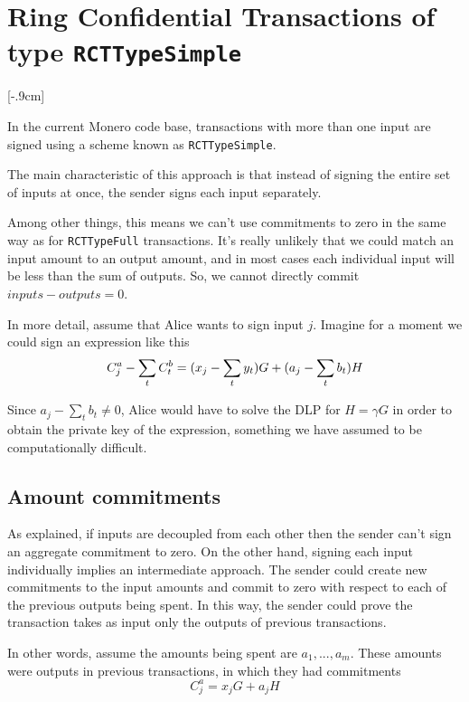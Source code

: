 \section{Ring Confidential Transactions of type {\tt RCTTypeSimple}}[-.9cm]
\label{sec:RCTTypeSimple}

In the current Monero code base, transactions with more than one input are signed using a scheme known as {\tt RCTTypeSimple}.

The main characteristic of this approach is that instead of signing the entire set of inputs at once, the sender signs each input separately.

Among other things, this means we can’t use commitments to zero in the same way as for {\tt RCTTypeFull} transactions. It's really unlikely that we could match an input amount to an output amount, and in most cases each individual input will be less than the sum of outputs. So, we cannot directly commit $inputs - outputs = 0$.

In more detail, assume that Alice wants to sign input $j$. Imagine for a moment we could sign an expression like this\vspace{.2cm}
\[  C^a_{j} - \sum\limits_t C^b_{t} \\
= (x_j -  \sum_t y_t) G + (a_j - \sum\limits_t  b_t) H \]

Since \(a_j - \sum\limits_t  b_t \ne 0\), Alice would have to solve the DLP for \(H = \gamma G\) in order to obtain the private key of the expression, something we have assumed to be computationally difficult.


\subsection{Amount commitments}
\label{RCTTypeSimple-commitments}

As explained, if inputs are decoupled from each other then the sender can't sign an aggregate commitment to zero. On the other hand, signing each input individually implies an intermediate approach. The sender could create new commitments to the input amounts and commit to zero with respect to each of the previous outputs being spent. In this way, the sender could prove the transaction takes as input only the outputs of previous transactions.

In other words, assume the amounts being spent are \(a_1, ..., a_m\). These amounts were outputs in previous transactions, in which they had commitments\vspace{.2cm}
\[C^a_{j} = x_j G + a_j H\]


